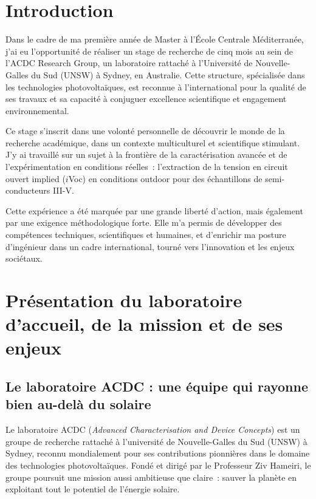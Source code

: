 \documentclass[12pt,a4paper]{report}
\begin{document}
\tableofcontents
\listoffigures
\listoftables

\chapter*{Introduction}

Dans le cadre de ma première année de Master à l'École Centrale Méditerranée, j'ai eu l'opportunité de réaliser un stage de recherche de cinq mois au sein de l'ACDC Research Group, un laboratoire rattaché à l'Université de Nouvelle-Galles du Sud (UNSW) à Sydney, en Australie. Cette structure, spécialisée dans les technologies photovoltaïques, est reconnue à l'international pour la qualité de ses travaux et sa capacité à conjuguer excellence scientifique et engagement environnemental.

Ce stage s'inscrit dans une volonté personnelle de découvrir le monde de la recherche académique, dans un contexte multiculturel et scientifique stimulant. J'y ai travaillé sur un sujet à la frontière de la caractérisation avancée et de l'expérimentation en conditions réelles~: l'extraction de la tension en circuit ouvert implied ($i$Voc) en conditions outdoor pour des échantillons de semi-conducteurs III-V.

Cette expérience a été marquée par une grande liberté d'action, mais également par une exigence méthodologique forte. Elle m'a permis de développer des compétences techniques, scientifiques et humaines, et d'enrichir ma posture d'ingénieur dans un cadre international, tourné vers l'innovation et les enjeux sociétaux.

\chapter{Présentation du laboratoire d'accueil, de la mission et de ses enjeux}

\section{Le laboratoire ACDC : une équipe qui rayonne bien au-delà du solaire}

Le laboratoire ACDC (\textit{Advanced Characterisation and Device Concepts}) est un groupe de recherche rattaché à l'université de Nouvelle-Galles du Sud (UNSW) à Sydney, reconnu mondialement pour ses contributions pionnières dans le domaine des technologies photovoltaïques. Fondé et dirigé par le Professeur Ziv Hameiri, le groupe poursuit une mission aussi ambitieuse que claire~: sauver la planète en exploitant tout le potentiel de l'énergie solaire.
\end{document}
